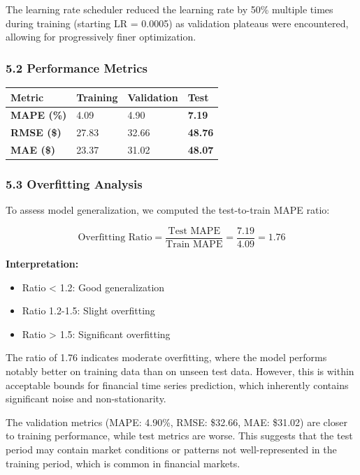 \documentclass[
]{article}
\newcounter{none} %
\begin{document}
The learning rate scheduler reduced the learning rate by 50\% multiple
times during training (starting LR = 0.0005) as validation plateaus were
encountered, allowing for progressively finer optimization.

\subsubsection{5.2 Performance Metrics}\label{52-performance-metrics}

{\def\LTcaptype{none} %
\begin{longtable}[]{@{}llll@{}}
\toprule\noalign{}
Metric & Training & Validation & Test \\
\midrule\noalign{}
\endhead
\bottomrule\noalign{}
\endlastfoot
\textbf{MAPE (\%)} & 4.09 & 4.90 & \textbf{7.19} \\
\textbf{RMSE (\$)} & 27.83 & 32.66 & \textbf{48.76} \\
\textbf{MAE (\$)} & 23.37 & 31.02 & \textbf{48.07} \\
\end{longtable}
}

\subsubsection{5.3 Overfitting Analysis}\label{53-overfitting-analysis}

To assess model generalization, we computed the test-to-train MAPE
ratio:

\[\text{Overfitting Ratio} = \frac{\text{Test MAPE}}{\text{Train MAPE}} = \frac{7.19}{4.09} = 1.76\]

\textbf{Interpretation:}

\begin{itemize}
\item
  Ratio \textless{} 1.2: Good generalization
\item
  Ratio 1.2-1.5: Slight overfitting
\item
  Ratio \textgreater{} 1.5: Significant overfitting
\end{itemize}

The ratio of 1.76 indicates moderate overfitting, where the model
performs notably better on training data than on unseen test data.
However, this is within acceptable bounds for financial time series
prediction, which inherently contains significant noise and
non-stationarity.

The validation metrics (MAPE: 4.90\%, RMSE: \$32.66, MAE: \$31.02) are
closer to training performance, while test metrics are worse. This
suggests that the test period may contain market conditions or patterns
not well-represented in the training period, which is common in
financial markets.
\end{document}
